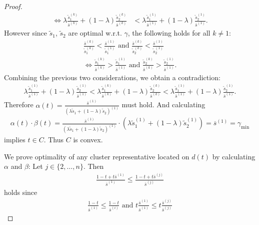 \documentclass{article}
\begin{document}
\begin{proof}
\begin{align*}
		\iff \lambda \frac{\tilde{s}_1^{(k)}}{\overline{s}^{(k)}} + (1-\lambda) \frac{\tilde{s}_2^{(k)}}{\overline{s}^{(k)}} &< \lambda \frac{\tilde{s}_1^{(1)}}{\overline{s}^{(1)}} + (1-\lambda) \frac{\tilde{s}_2^{(1)}}{\overline{s}^{(1)}}.
		\end{align*}
		However since $\tilde{s}_1$, $\tilde{s}_2$ are optimal w.r.t. $\gamma$, the following holds for all $k \neq 1$:
		\begin{align*}
		\frac{\overline{s}^{(k)}}{\tilde{s}_1^{(k)}} < \frac{\overline{s}^{(1)}}{\tilde{s}_1^{(1)}} \text{  and  }
		\frac{\overline{s}^{(k)}}{\tilde{s}_2^{(k)}} < \frac{\overline{s}^{(1)}}{\tilde{s}_2^{(1)}}\\
		\iff \frac{\tilde{s}_1^{(k)}}{\overline{s}^{(k)}} > \frac{\tilde{s}_1^{(1)}}{\overline{s}^{(1)}} \text{  and  }
		\frac{\tilde{s}_2^{(k)}}{\overline{s}^{(k)}} > \frac{\tilde{s}_2^{(1)}}{\overline{s}^{(1)}}.
		\end{align*}
		Combining the previous two considerations, we obtain a contradiction:
		\begin{align*}
		\lambda \frac{\tilde{s}_1^{(1)}}{\overline{s}^{(1)}} + (1-\lambda) \frac{\tilde{s}_2^{(1)}}{\overline{s}^{(1)}} < \lambda \frac{\tilde{s}_1^{(k)}}{\overline{s}^{(k)}} + (1-\lambda) \frac{\tilde{s}_2^{(k)}}{\overline{s}^{(k)}} < \lambda \frac{\tilde{s}_1^{(1)}}{\overline{s}^{(1)}} + (1-\lambda) \frac{\tilde{s}_2^{(1)}}{\overline{s}^{(1)}}.
		\end{align*}
		Therefore $\alpha(t) = \frac{\overline{s}^{(1)}}{(\lambda \tilde{s}_1 + (1-\lambda) \tilde{s}_2)^{(1)}}$ must hold. And calculating
		\begin{align*}
		\alpha(t) \cdot \beta(t) = \frac{\overline{s}^{(1)}}{(\lambda \tilde{s}_1 + (1-\lambda) \tilde{s}_2)^{(1)}} \cdot \left(\lambda \tilde{s}_1^{(1)} + (1-\lambda) \tilde{s}_2^{(1)} \right) = \overline{s}^{(1)} = \gamma_{\min}
		\end{align*}
		implies $t \in C$. Thus $C$ is convex.
		\iffalse
		\item We prove optimality of any cluster representative located on $d(t)$ by calculating $\alpha$ and $\beta$:
		Let $j \in \{2, \ldots, n \}$. Then
		\begin{align*}
		\frac{1-t + t\overline{s}^{(1)}}{\overline{s}^{(1)}} \leq \frac{1-t + t\overline{s}^{(j)}}{\overline{s}^{(j)}}
		\end{align*}
		holds since
		\begin{align*}
		\frac{1-t}{\overline{s}^{(1)}} \leq \frac{1-t}{\overline{s}^{(i)}} \text{   and   } t \frac{\overline{s}^{(1)}}{\overline{s}^{(1)}} \leq t \frac{\overline{s}^{(j)}}{\overline{s}^{(j)}}

\end{align*}
\end{proof}
\end{document}
